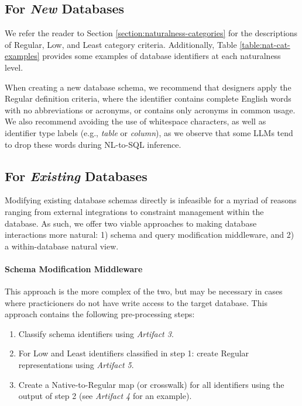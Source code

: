 \subsection{For \emph{New} Databases}
We refer the reader to Section \ref{section:naturalness-categories} for the descriptions of Regular, Low, and Least category criteria. 
Additionally, Table \ref{table:nat-cat-examples} provides some examples of database identifiers at each naturalness level.

When creating a new database schema, we recommend that designers apply the Regular definition criteria, where the identifier contains complete English words with no abbreviations or acronyms, or contains only acronyms in common usage.
We also recommend avoiding the use of whitespace characters, as well as identifier type labels (e.g., \emph{table} or \emph{column}), as we observe that some LLMs tend to drop these words during NL-to-SQL inference.

\subsection{For \emph{Existing} Databases}

Modifying existing database schemas directly is infeasible for a myriad of reasons ranging from external integrations to constraint management within the database.
As such, we offer two viable approaches to making database interactions more natural: 1) schema and query modification middleware, and 2) a within-database natural view.

\paragraph{\textbf{Schema Modification Middleware}}
This approach is the more complex of the two, but may be necessary in cases where practicioners do not have write access to the target database.
This approach contains the following pre-processing steps:
\begin{enumerate}
  \item Classify schema identifiers using \emph{Artifact 3}.
  \item For Low and Least identifiers classified in step 1: create Regular representations using \emph{Artifact 5}.
  \item Create a Native-to-Regular map (or crosswalk) for all identifiers using the output of step 2 (see \emph{Artifact 4} for an example).
\end{enumerate}

